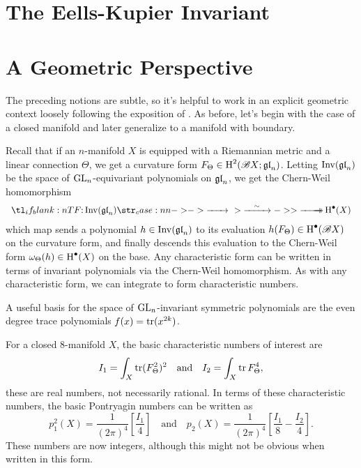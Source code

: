 \section{The Eells-Kupier Invariant}\label{sec:eells-kupier_invariant}



\section{A Geometric Perspective}\label{sec:a_geometric_perspective}

The preceding notions are subtle, so it's helpful to work in an explicit geometric context loosely following the exposition of \cite{witten1985global}. As before, let's begin with the case of a closed manifold and later generalize to a manifold with boundary.

Recall that if an $n$-manifold $X$ is equipped with a Riemannian metric and a linear connection $\Theta$, we get a curvature form $F_\Theta\in \operatorname{H}^2(\mathscr{B} X; \mathfrak{gl}_n)$. Letting $\operatorname{\operatorname{Inv}}(\mathfrak{gl}_n)$ be the space of ${\operatorname{GL}}_n$-equivariant polynomials on $\mathfrak{gl}_n$, we get the Chern-Weil homomorphism
\[
	\lkxfunc{}{\Inv(\gl_n)}{\H^\bullet(X)}
\]
which map sends a polynomial $h\in \operatorname{\operatorname{Inv}}(\mathfrak{gl}_n)$ to its evaluation $h(F_\Theta)\in \operatorname{H}^\bullet(\mathscr{B} X)$ on the curvature form, and finally descends this evaluation to the Chern-Weil form $\omega_\Theta(h) \in \operatorname{H}^\bullet(X)$ on the base. Any characteristic form can be written in terms of invariant polynomials via the Chern-Weil homomorphism. As with any characteristic form, we can integrate to form characteristic numbers.

\begin{note*}
	A useful basis for the space of ${\operatorname{GL}}_n$-invariant symmetric polynomials are the even degree trace polynomials $f(x)=\operatorname{\operatorname{tr}}(x^{2k})$.
\end{note*}

\begin{example}\label{exam:chern-weil_8-manifold}
	For a closed $8$-manifold $X$, the basic characteristic numbers of interest are
	\[
		I_1 = \int_X \operatorname{\operatorname{tr}} (F_\Theta^2)^2
		\quad\textrm{and}\quad
		I_2 = \int_X \operatorname{\operatorname{tr}} F_\Theta^4,
	\]
	these are real numbers, not necessarily rational. In terms of these characteristic numbers, the basic Pontryagin numbers can be written as
	\[
		p_1^2(X) = \frac{1}{(2\pi)^4} \left[\frac{I_1}{4}\right]
		\quad\textrm{and}\quad
		p_2(X) = \frac{1}{(2\pi)^4}\left[\frac{I_1}{8} - \frac{I_2}{4}\right].
	\]
	These numbers are now integers, although this might not be obvious when written in this form.
\end{example}

